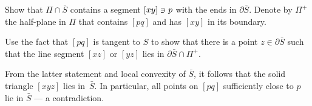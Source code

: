 Show that $\Pi\cap \bar S$ contains a segment $[xy]\z\ni p$ with the ends in $\partial \bar S$.
Denote by $\Pi^+$ the half-plane in $\Pi$ that contains $[pq]$ and has $[xy]$ in its boundary.

Use the fact that $[pq]$ is tangent to $S$ to show that there is a point $z\in\partial \bar S$ such that the line segment $[xz]$ or $[yz]$ lies in $\partial \bar S\cap\Pi^+$.
 

From the latter statement and local convexity of $\bar S$, 
it follows that the solid triangle $[xyz]$ lies in~$\bar S$.
In particular, all points on $[pq]$ sufficiently close to $p$ lie in $\bar S$ --- a contradiction.


